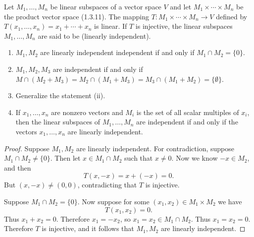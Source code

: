 \begin{tcolorbox}[title=Problem 19, breakable]
    Let $M_1, \ldots, M_n$ be linear 
    subspaces of a vector space $V$ and let 
    $M_1 \times \cdots \times M_n$ be the 
    product vector space (1.3.11). The mapping 
    $T : M_1 \times \cdots \times M_n \longrightarrow V$
    defined by $T(x_1, \ldots, x_n) = x_1 + \cdots + x_n$
    is linear. If $T$ is injective, the linear 
    subspaces $M_1, \ldots, M_n$ are 
    said to be (linearly independent).
    \begin{enumerate}
        \item $M_1, M_2$ are linearly independent independent if and only if $M_1 \cap M_2 = \{0\}$.
        \item $M_1, M_2, M_3$ are independent if and only if $M \cap (M_2 + M_3) = M_2 \cap (M_1 + M_3) = M_3 \cap (M_1 + M_2) = \{\emptyset\}$.
        \item Generalize the statement (ii).
        \item If $x_1, \ldots, x_n$ are nonzero vectors and $M_i$ is the set of all scalar 
        multiples of $x_i$, then the linear subspaces of $M_1, \ldots, M_n$ are independent
        if and only if the vectors $x_1, \ldots, x_n$ are linearly independent.
    \end{enumerate}
\end{tcolorbox}

\begin{proof}
    \underbar{\textbf{($\longrightarrow$)}}
    Suppose $M_1, M_2$ are linearly independent.
    For contradiction, suppose $M_1 \cap M_2 \ne \{0\}$.
    Then let $x \in M_1 \cap M_2$ such that $x \ne 0$.
    Now we know $-x \in M_2$, and then
    \[
    T(x,-x)=x+(-x)=0.
    \]
    But $(x,-x)\ne (0,0)$, contradicting that $T$ is injective.

    \underbar{\textbf{($\longleftarrow$)}}
    Suppose $M_1 \cap M_2 = \{0\}$.
    Now suppose for some $(x_1,x_2)\in M_1\times M_2$ we have
    \[
    T(x_1,x_2)=0.
    \]
    Thus $x_1+x_2=0$. Therefore $x_1=-x_2$, so $x_1=x_2\in M_1\cap M_2$. Thus $x_1=x_2=0$.
    Therefore $T$ is injective, and it follows that $M_1,M_2$ are linearly independent.
\end{proof}

